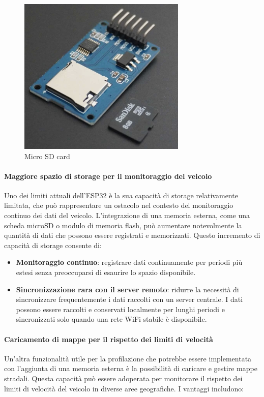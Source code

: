 \documentclass[12pt, a4paper, italian]{report}
\numberwithin{figure}{chapter}
\numberwithin{table}{chapter}
\begin{document}
\begin{figure}[h]
  \centering
  \includegraphics[width=8cm]{MicroSD.png}
  \caption{Micro SD card}
  \label{fig:MicroSD}
\end{figure}

\paragraph{Maggiore spazio di storage per il monitoraggio del veicolo} 
Uno dei limiti attuali dell'ESP32 è la sua capacità di storage relativamente limitata, che può rappresentare un ostacolo nel contesto del monitoraggio continuo dei dati del veicolo. L'integrazione di una memoria esterna, come una scheda microSD o modulo di memoria flash, può aumentare notevolmente la quantità di dati che possono essere registrati e memorizzati. Questo incremento di capacità di storage consente di:

\begin{itemize}
    \item \textbf{Monitoraggio continuo}: registrare dati continuamente per periodi più estesi senza preoccuparsi di esaurire lo spazio disponibile.
    \item \textbf{Sincronizzazione rara con il server remoto}: ridurre la necessità di sincronizzare frequentemente i dati raccolti con un server centrale. I dati possono essere raccolti e conservati localmente per lunghi periodi e sincronizzati solo quando una rete WiFi stabile è disponibile.
\end{itemize}

\paragraph{Caricamento di mappe per il rispetto dei limiti di velocità} 
Un'altra funzionalità utile per la profilazione che potrebbe essere implementata con l'aggiunta di una memoria esterna è la possibilità di caricare e gestire mappe stradali. Questa capacità può essere adoperata per monitorare il rispetto dei limiti di velocità del veicolo in diverse aree geografiche. I vantaggi includono:
\end{document}
